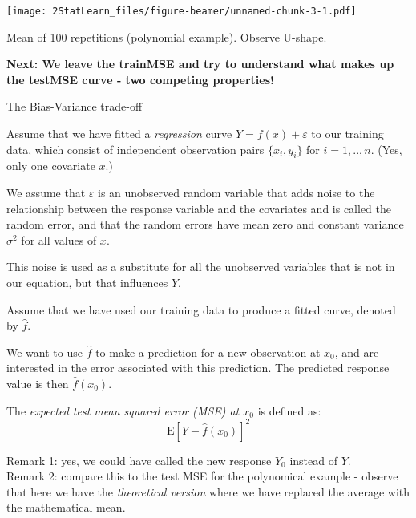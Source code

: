 \documentclass[ignorenonframetext,]{beamer}
\begin{document}
\begin{frame}

\texttt{[image: 2StatLearn\_files/figure-beamer/unnamed-chunk-3-1.pdf]}

Mean of 100 repetitions (polynomial example). Observe U-shape.

\textbf{Next: We leave the trainMSE and try to understand what makes up
the testMSE curve - two competing properties!}

\end{frame}

\begin{frame}{The Bias-Variance trade-off}

Assume that we have fitted a \emph{regression} curve
\(Y = f(x) + \varepsilon\) to our training data, which consist of
independent observation pairs \(\{x_i, y_i\}\) for \(i=1,..,n\). (Yes,
only one covariate \(x\).)

We assume that \(\varepsilon\) is an unobserved random variable that
adds noise to the relationship between the response variable and the
covariates and is called the random error, and that the random errors
have mean zero and constant variance \(\sigma^2\) for all values of
\(x\).

This noise is used as a substitute for all the unobserved variables that
is not in our equation, but that influences \(Y\).

Assume that we have used our training data to produce a fitted curve,
denoted by \(\hat{f}\).

\end{frame}

\begin{frame}

We want to use \(\hat{f}\) to make a prediction for a new observation at
\(x_0\), and are interested in the error associated with this
prediction. The predicted response value is then \(\hat{f}(x_0)\).

The \emph{expected test mean squared error (MSE) at \(x_0\)} is defined
as: \[\text{E}[Y - \hat{f}(x_0)]^2\]

Remark 1: yes, we could have called the new response \(Y_0\) instead of
\(Y\).\\
Remark 2: compare this to the test MSE for the polynomical example -
observe that here we have the \emph{theoretical version} where we have
replaced the average with the mathematical mean.

\end{frame}
\end{document}
